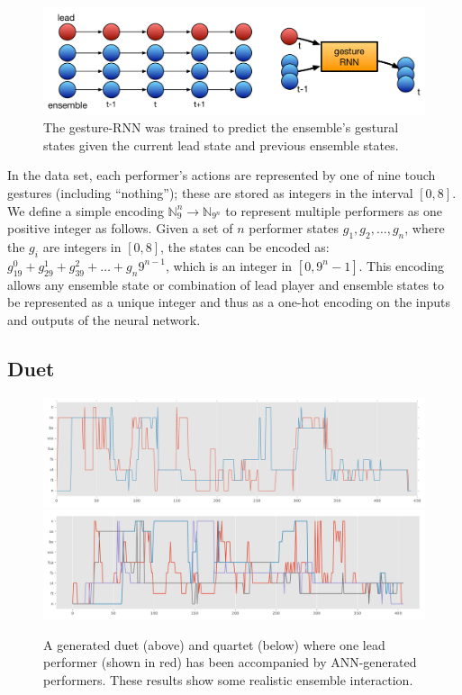 \documentclass[sigchi, authorversion=true]{acmart}
\begin{document}
\begin{figure}
  \includegraphics[width=\columnwidth]{nn-ensemble-training}
  \caption{The gesture-RNN was trained to predict the ensemble's
    gestural states given the current lead state and previous ensemble
    states.}\label{fig:nn-ensemble-training}
\end{figure}

In the data set, each performer's actions are represented by one of
nine touch gestures (including ``nothing''); these are stored as
integers in the interval $[0,8]$. We define a simple encoding
$\mathbb{N}_{9}^n \rightarrow \mathbb{N}_{9^n}$ to represent multiple
performers as one positive integer as follows. Given a set of $n$
performer states $g_1, g_2, \ldots, g_n$, where the $g_i$ are integers
in $[0,8]$, the states can be encoded as:
$ g_19^0 + g_29^1 + g_39^2 + \ldots + g_n9^{n-1} $, which is an integer
in $[0,9^n - 1]$.
This encoding allows any ensemble state or combination of lead player
and ensemble states to be represented as a unique integer and thus as
a one-hot encoding on the inputs and outputs of the neural network.

\subsection{Duet}

\begin{figure}
  \centering
  \includegraphics[width=\columnwidth]{duet-performance-512n-30ep-14.pdf}
  \includegraphics[width=\columnwidth]{gesture-rnn-4to3-512n3l-perf-102.pdf}
  \caption{A generated duet (above) and quartet (below) where one lead
    performer (shown in red) has been accompanied by ANN-generated
    performers. These results
    show some realistic ensemble interaction.}\label{fig:model-examples}
\end{figure}
\end{document}
